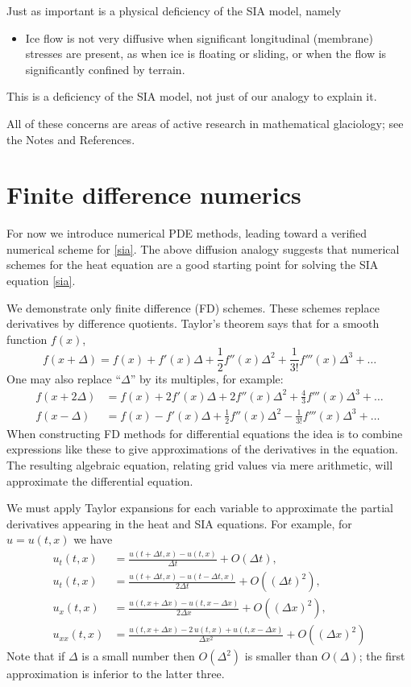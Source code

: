 \documentclass[letterpaper,final,12pt,reqno]{amsart}
\begin{document}
Just as important is a physical deficiency of the SIA model, namely
\begin{itemize}
\item Ice flow is not very diffusive when significant longitudinal (membrane) stresses are present, as when ice is floating or sliding, or when the flow is significantly confined by terrain.
\end{itemize}
This is a deficiency of the SIA model, not just of our analogy to explain it.

All of these concerns are areas of active research in mathematical glaciology; see the Notes and References.


\section{Finite difference numerics}  \label{sec:fd}

For now we introduce numerical PDE methods, leading toward a verified numerical scheme for \eqref{sia}.  The above diffusion analogy suggests that numerical schemes for the heat equation are a good starting point for solving the SIA equation \eqref{sia}.

We demonstrate only finite difference (FD) schemes.  These schemes replace derivatives by difference quotients.  Taylor's theorem says that for a smooth function $f(x)$,
	$$f(x+\Delta) = f(x) + f'(x) \Delta + \frac{1}{2} f''(x) \Delta^2 + \frac{1}{3!} f'''(x) \Delta^3 + \dots$$
One may also replace ``$\Delta$'' by its multiples, for example:
\begin{align*}
f(x+2\Delta) &= f(x) + 2 f'(x) \Delta + 2 f''(x) \Delta^2 + \frac{4}{3} f'''(x) \Delta^3 + \dots \\
f(x-\Delta) &= f(x) - f'(x) \Delta + \frac{1}{2} f''(x) \Delta^2 - \frac{1}{3!} f'''(x) \Delta^3 + \dots
\end{align*}
When constructing FD methods for differential equations the idea is to combine expressions like these to give approximations of the derivatives in the equation.  The resulting algebraic equation, relating grid values via mere arithmetic, will approximate the differential equation.

We must apply Taylor expansions for each variable to approximate the partial derivatives appearing in the heat and SIA equations.  For example, for $u=u(t,x)$ we have
\begin{align*}
u_t(t,x) &= \frac{u(t+\Delta t,x) - u(t,x)}{\Delta t} + O(\Delta t), \\
u_t(t,x) &= \frac{u(t+\Delta t,x) - u(t-\Delta t,x)}{2\Delta t} + O((\Delta t)^2), \\
u_x(t,x) &= \frac{u(t,x+\Delta x) - u(t,x-\Delta x)}{2\Delta x} + O((\Delta x)^2), \\
u_{xx}(t,x) &= \frac{u(t,x+\Delta x) - 2\, u(t,x) + u(t,x-\Delta x)}{\Delta x^2} + O((\Delta x)^2)
\end{align*}
Note that if $\Delta$ is a small number then $O(\Delta^2)$ is smaller than $O(\Delta)$; the first approximation is inferior to the latter three.
\end{document}
